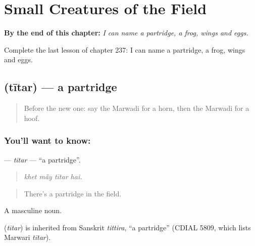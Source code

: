 
\chapter{Small Creatures of the Field}
\label{ch:mw-small-creatures-of-the-field}

\begin{chapteropening}
\textbf{By the end of this chapter:} \emph{I can name a partridge, a frog, wings and eggs.}

Complete the last lesson of chapter 237: I can name a partridge, a frog, wings and eggs.
\end{chapteropening}

\section[\texorpdfstring{\mw{तीतर} (tītar)}{तीतर (tītar)}]{ (tītar) — a partridge}

\label{lesson:MW-C237-titar}



\begin{quote}
Before the new one: say the Marwadi for a horn, then the Marwadi for a hoof.
\end{quote}

\subsection*{You'll want to know: }
\textbf{} — \emph{tītar} — \textquotedblleft{}a partridge\textquotedblright{}.

\begin{quote}
   
\end{quote}

\begin{quote}
\emph{khet mā̃y tītar hai.}
\end{quote}

\begin{quote}
There's a partridge in the field.
\end{quote}

A masculine noun.

\begin{cousinweb}
\textbf{} (\emph{tītar}) is inherited from Sanskrit \emph{tittira}, \textquotedblleft{}a partridge\textquotedblright{} (CDIAL 5809, which lists Marwari \emph{tītar}).
\end{cousinweb}

